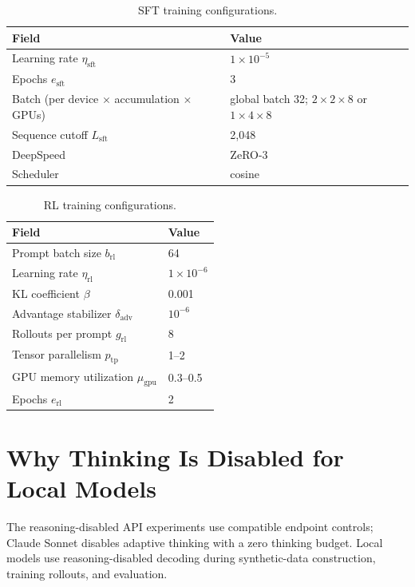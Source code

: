 \begin{table}[H]
\centering
\small
\begin{tabular}{p{4.3cm}p{7.2cm}}
\toprule
\rowcolor{algobg}
Field & Value \\
\midrule
Learning rate \(\eta_{\mathrm{sft}}\) & \(1\times10^{-5}\) \\
Epochs \(e_{\mathrm{sft}}\) & 3 \\
Batch (per device \(\times\) accumulation \(\times\) GPUs)
  & global batch 32; \(2\times2\times8\) or \(1\times4\times8\) \\
Sequence cutoff \(L_{\mathrm{sft}}\) & 2,048 \\
DeepSpeed & ZeRO-3 \\
Scheduler & cosine \\
\bottomrule
\end{tabular}
\caption{SFT training configurations.}
\label{tab:sft-training-config}
\end{table}

\begin{table}[H]
\centering
\small
\begin{tabular}{p{4.3cm}p{7.2cm}}
\toprule
\rowcolor{algobg}
Field & Value \\
\midrule
Prompt batch size \(b_{\mathrm{rl}}\) & 64 \\
Learning rate \(\eta_{\mathrm{rl}}\) & \(1\times10^{-6}\) \\
KL coefficient \(\beta\) & 0.001 \\
Advantage stabilizer \(\delta_{\mathrm{adv}}\) & \(10^{-6}\) \\
Rollouts per prompt \(g_{\mathrm{rl}}\) & 8 \\
Tensor parallelism \(p_{\mathrm{tp}}\) & 1--2 \\
GPU memory utilization \(\mu_{\mathrm{gpu}}\) & 0.3--0.5 \\
Epochs \(e_{\mathrm{rl}}\) & 2 \\
\bottomrule
\end{tabular}
\caption{RL training configurations.}
\label{tab:rl-training-config}
\end{table}

\section{Why Thinking Is Disabled for Local Models}
\label{app:no-thinking}

The reasoning-disabled API experiments use compatible endpoint controls;
Claude Sonnet disables adaptive thinking with a zero thinking budget.  Local
models use reasoning-disabled decoding during synthetic-data construction,
training rollouts, and evaluation.


